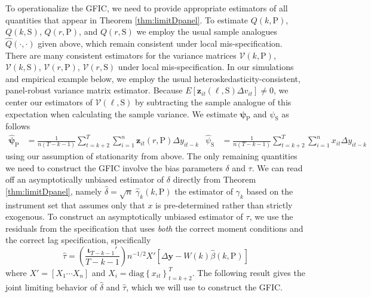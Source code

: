 To operationalize the GFIC, we need to provide appropriate estimators of all quantities that appear in Theorem \ref{thm:limitDpanel}.
To estimate ${Q}(k,\text{P})$, ${Q}(k,\text{S})$, ${Q}(r,\text{P})$, and ${Q}(r,\text{S})$ we employ the usual sample analogues $\widehat{Q}(\cdot,\cdot)$ given above, which remain consistent under local mis-specification.
There are many consistent estimators for the variance matrices $\mathcal{V}(k,\text{P})$, $\mathcal{V}(k,\text{S})$, $\mathcal{V}(r,\text{P})$, $\mathcal{V}(r,\text{S})$ under local mis-specification.
In our simulations and empirical example below, we employ the usual heteroskedasticity-consistent, panel-robust variance matrix estimator.
Because $E[\mathbf{z}_{it}(\ell,\text{S})\Delta v_{it}]\neq 0$, we center our estimators of $\mathcal{V}(\ell, \text{S})$ by subtracting the sample analogue of this expectation when calculating the sample variance.
We estimate $\boldsymbol{\psi}_{\text{P}}$ and $\psi_{\text{S}}$ as follows
\begin{align*}
  \widehat{\boldsymbol{\psi}}_{\text{P}} &= \frac{1}{n(T - k - 1)}\sum_{t = k+2}^T \sum_{i = 1}^n \mathbf{z}_{it}(r,\text{P}) \Delta y_{it-k} &
  \widehat{\psi}_{\text{S}} &= \frac{1}{n(T - k - 1)}\sum_{t = k+2}^T \sum_{i = 1}^n x_{it} \Delta y_{it-k}
\end{align*}
using our assumption of stationarity from above.
The only remaining quantities we need to construct the GFIC involve the bias parameters $\delta$ and $\tau$. 
We can read off an asymptotically unbiased estimator of $\delta$ directly from Theorem \ref{thm:limitDpanel}, namely $\widehat{\delta} = \sqrt{n}\; \widehat{\gamma}_k(k,\text{P})$ the estimator of $\gamma_k$ based on the instrument set that assumes only that $x$ is pre-determined rather than strictly exogenous.
To construct an asymptotically unbiased estimator of $\tau$, we use the residuals from the specification that uses \emph{both} the correct moment conditions and the correct lag specification, specifically
\begin{equation}
  \label{eq:DpanelTau}
  \widehat{\tau} = \left( \frac{\boldsymbol{\iota}_{T-k-1}'}{T - k - 1} \right) n^{-1/2} X' \left[\Delta \mathbf{y} - W(k)\widehat{\beta}(k,\text{P})  \right]
\end{equation}
where $X' = [X_1 \cdots X_n]$ and $X_i = \mbox{diag}\left\{ x_{it} \right\}_{t = k + 2}^{T}$.
The following result gives the joint limiting behavior of $\widehat{\delta}$ and $\widehat{\tau}$, which we will use to construct the GFIC.

